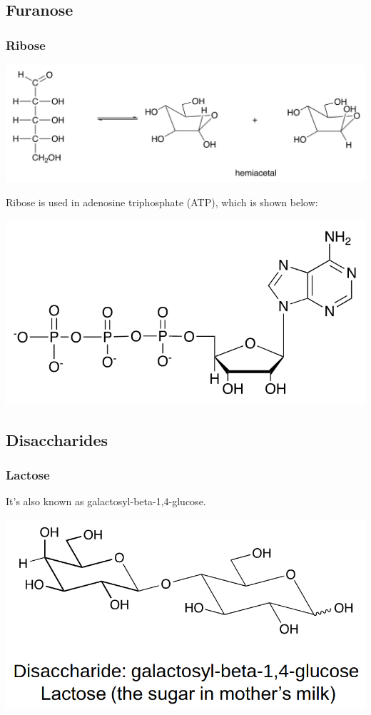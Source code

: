 \documentclass[11pt]{article}
\begin{document}
\newpage
\subsection{Furanose}
\label{sec:org36f2bdf}

\subsubsection{Ribose}
\label{sec:orgde17fb5}
\begin{center}
\includegraphics[width=.9\linewidth]{./images/ribose.png}
\end{center}

Ribose is used in adenosine triphosphate (ATP), which is shown below:
\begin{center}
\includegraphics[width=.9\linewidth]{./images/atp.png}
\end{center}

\newpage
\subsection{Disaccharides}
\label{sec:org20d883e}

\subsubsection{Lactose}
\label{sec:org62447d2}
It's also known as galactosyl-beta-1,4-glucose.
\begin{center}
\includegraphics[width=.9\linewidth]{./images/lactose.png}
\end{center}
\end{document}
